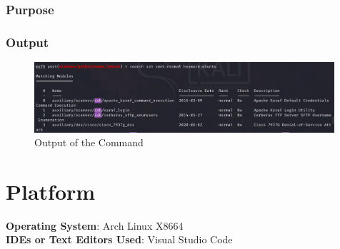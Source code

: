 \documentclass[11pt]{article}
\begin{document}
\subsubsection*{Purpose}

\subsubsection*{Output}
\begin{figure}[H]
    \centering
    \includegraphics[width=0.99\textwidth]{a3_ss (29).png}
    \caption{Output of the Command}
\end{figure}


\section{Platform}
\textbf{Operating System}: Arch Linux X8664 \\
\textbf{IDEs or Text Editors Used}: Visual Studio Code\\

% 
\end{document}
